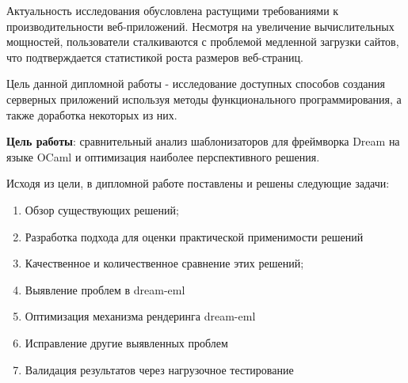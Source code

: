 Актуальность исследования обусловлена растущими требованиями к производительности веб-приложений.
Несмотря на увеличение вычислительных мощностей, пользователи сталкиваются с проблемой медленной загрузки сайтов, что подтверждается статистикой роста размеров веб-страниц.




Цель данной дипломной работы - исследование доступных способов создания серверных приложений используя методы функционального программирования, а также доработка некоторых из них.

\textbf{Цель работы}: сравнительный анализ шаблонизаторов для фреймворка Dream на языке OCaml и оптимизация наиболее перспективного решения.

Исходя из цели, в дипломной работе поставлены и решены следующие задачи:

\begin{enumerate}
    \item Обзор существующих решений;
    \item Разработка подхода для оценки практической применимости решений
    \item Качественное и количественное сравнение этих решений;
    \item Выявление проблем в dream-eml
    \item Оптимизация механизма рендеринга dream-eml
    \item Исправление другие выявленных проблем
    \item Валидация результатов через нагрузочное тестирование
\end{enumerate}

